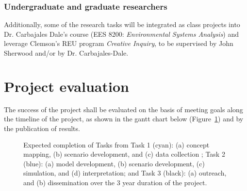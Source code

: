 \documentclass[11pt,a4paper]{article}
\begin{document}
\subsubsection{Undergraduate and graduate researchers}

Additionally, some of the research tasks will be 
integrated as class projects into Dr. Carbajales Dale's course 
(EES 8200: \emph{Environmental Systems Analysis}) and  
leverage Clemson's REU program \emph{Creative Inquiry}, 
to be supervised by John Sherwood and/or by Dr. Carbajales-Dale.

\section{Project evaluation}

The success of the project shall be evaluated on the basis of 
meeting goals along the timeline of the project,
as shown in the gantt chart below (Figure~\ref{fig:gantt})
and by the publication of results.  

\begin{figure}[!ht]
\centering
  \begin{gantt}{11}{12}
    \begin{ganttitle}
    \end{ganttitle}
    \begin{ganttitle}
    \end{ganttitle}
  \end{gantt}
\label{fig:gantt}
\caption{Expected completion of Tasks from 
				Task 1 (cyan): 	(a) concept mapping, 
										(b) scenario development, and 
										(c) data collection ; 
				Task 2 (blue): 	(a) model development,
										(b) scenario development,
										(c) simulation, and
										(d) interpretation; and
				Task 3 (black):	(a) outreach, and
										(b) dissemination
				over the  3 year duration of the project.}
\end{figure}
\end{document}
